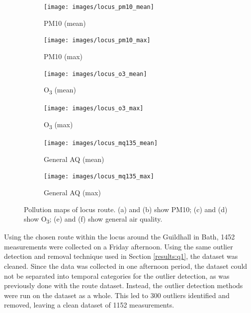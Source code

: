 \documentclass[11pt]{report}
\begin{document}
\begin{figure}[!htb]
    \centering
    \begin{minipage}{1\linewidth}
            \begin{subfigure}[t]{.5\linewidth}
                \texttt{[image: images/locus\_pm10\_mean]}
                \caption{PM10 (mean)}
                \label{fig:locus_pm10_mean}
            \end{subfigure}
            \begin{subfigure}[t]{.5\linewidth}
            	\texttt{[image: images/locus\_pm10\_max]}
            	\caption{PM10 (max)}
            	\label{fig:locus_pm10_max}
	   \end{subfigure}
        \end{minipage}
    \begin{minipage}{1\linewidth}
            \begin{subfigure}[t]{.5\linewidth}
                \texttt{[image: images/locus\_o3\_mean]}
                \caption{O\textsubscript{3} (mean)}
                \label{fig:locus_o3_mean}
            \end{subfigure}
            \begin{subfigure}[t]{.5\linewidth}
            	\texttt{[image: images/locus\_o3\_max]}
            	\caption{O\textsubscript{3} (max)}
            	\label{fig:locus_o3_max}
	   \end{subfigure}
        \end{minipage}
    \begin{minipage}{1\linewidth}
            \begin{subfigure}[t]{.5\linewidth}
                \texttt{[image: images/locus\_mq135\_mean]}
                \caption{General AQ (mean)}
                \label{fig:locus_mq135_mean}
            \end{subfigure}
            \begin{subfigure}[t]{.5\linewidth}
            	\texttt{[image: images/locus\_mq135\_max]}
            	\caption{General AQ (max)}
            	\label{fig:locus_mq135_max}
	   \end{subfigure}
        \end{minipage}
    \caption[Pollution maps of locus route.]{Pollution maps of locus route. (a) and (b) show PM10; (c) and (d) show O\textsubscript{3}; (e) and (f) show general air quality.}
    \label{fig:locus_maps}
\end{figure}

Using the chosen route within the locus around the Guildhall in Bath, \num{1452} measurements were collected on a Friday afternoon. Using the same outlier detection and removal technique used in Section \ref{results:q1}, the dataset was cleaned. Since the data was collected in one afternoon period, the dataset could not be separated into temporal categories for the outlier detection, as was previously done with the route dataset. Instead, the outlier detection methods were run on the dataset as a whole. This led to 300 outliers identified and removed, leaving a clean dataset of 1152 measurements.
\end{document}
